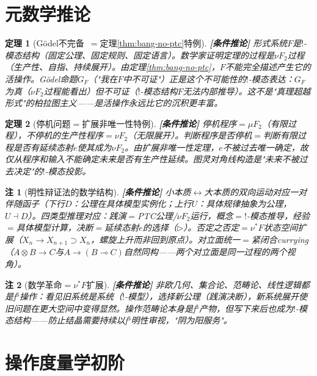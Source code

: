 \documentclass[11pt,a4paper]{article}
\newtheorem{theorem}{定理}
\newtheorem{remark}{注}
\newcommand{\lvl}[1]{\hfill\textbf{\footnotesize[#1]}}
\newcommand{\lvC}{\lvl{条件推论}}
\newcommand{\bang}{{!}}
\begin{document}
\section{元数学推论}

\begin{theorem}[G\"odel不完备~\cite{godel31}$=$定理\ref{thm:bang-no-ptc}特例]\label{thm:godel}\lvC
形式系统$F$是$\bang$-模态结构（固定公理、固定规则、固定语言）。数学家证明定理的过程是$\nu F_2$过程（生产性、自指、持续展开）。由定理\ref{thm:bang-no-ptc}，$F$不能完全描述产生它的活操作。G\"odel命题$G_F$（"我在$F$中不可证"）正是这个不可能性的$\bang$-模态表达：$G_F$为真（$\nu F_2$过程能看出）但不可证（$\bang$-模态结构$F$无法内部推导）。这不是"真理超越形式"的柏拉图主义——是活操作永远比它的沉积更丰富。
\end{theorem}

\begin{theorem}[停机问题$=$扩展非唯一性特例]\label{thm:halting}\lvC
停机程序$=\mu F_2$（有限过程），不停机的生产性程序$=\nu F_2$（无限展开）。判断程序是否停机$=$判断有限过程是否有延续态射$e$使其成为$\nu F_2$。由扩展非唯一性定理，$e$不被过去唯一确定，故仅从程序和输入不能确定未来是否有生产性延续。图灵对角线构造是"未来不被过去决定"的$\bang$-模态投影。
\end{theorem}

\begin{remark}[明性辩证法的数学结构]\lvC
小本质$\leftrightarrow$大本质的双向运动对应一对伴随函子（下行$D$：公理在具体模型实例化；上行$U$：具体规律抽象为公理，$U\dashv D$）。四类型推理对应：践演$=$PTC公理/$\nu F_2$运行，概念$=$$\bang$-模态推导，经验$=$具体模型计算，决断$=$延续态射$e$的选择（$\triangleright$）。否定之否定$=$$\nu^*F$状态空间扩展（$X_n\to X_{n+1}\supset X_n$，螺旋上升而非回到原点）。对立面统一$=$紧闭合currying（$A\otimes B\to C$与$A\to(B\multimap C)$自然同构——两个对立面是同一过程的两个视角）。
\end{remark}

\begin{remark}[数学革命$=$$\nu^*F$扩展]\lvC
非欧几何、集合论、范畴论、线性逻辑都是f$^3$操作：看见旧系统是系统（$\bang$-模型），选择新公理（践演决断），新系统展开使旧问题在更大空间中变得显然。操作范畴论本身是f$^3$产物，但写下来后也成为$\bang$-模态结构——防止结晶需要持续以f$^3$明性审视，"阴为阳服务"。
\end{remark}


\section{操作度量学初阶}
\end{document}
